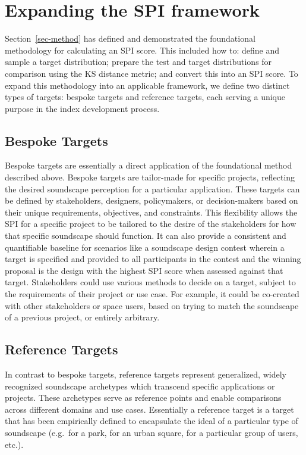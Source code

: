 \documentclass[
  authoryear,
  preprint,
  3p]{elsarticle}
\begin{document}
\section{Expanding the SPI framework}\label{expanding-the-spi-framework}

Section~\ref{sec-method} has defined and demonstrated the foundational
methodology for calculating an SPI score. This included how to: define
and sample a target distribution; prepare the test and target
distributions for comparison using the KS distance metric; and convert
this into an SPI score. To expand this methodology into an applicable
framework, we define two distinct types of targets: bespoke targets and
reference targets, each serving a unique purpose in the index
development process.

\subsection{Bespoke Targets}\label{bespoke-targets}

Bespoke targets are essentially a direct application of the foundational
method described above. Bespoke targets are tailor-made for specific
projects, reflecting the desired soundscape perception for a particular
application. These targets can be defined by stakeholders, designers,
policymakers, or decision-makers based on their unique requirements,
objectives, and constraints. This flexibility allows the SPI for a
specific project to be tailored to the desire of the stakeholders for
how that specific soundscape should function. It can also provide a
consistent and quantifiable baseline for scenarios like a soundscape
design contest wherein a target is specified and provided to all
participants in the contest and the winning proposal is the design with
the highest SPI score when assessed against that target. Stakeholders
could use various methods to decide on a target, subject to the
requirements of their project or use case. For example, it could be
co-created with other stakeholders or space users, based on trying to
match the soundscape of a previous project, or entirely arbitrary.

\subsection{Reference Targets}\label{reference-targets}

In contrast to bespoke targets, reference targets represent generalized,
widely recognized soundscape archetypes which transcend specific
applications or projects. These archetypes serve as reference points and
enable comparisons across different domains and use cases. Essentially a
reference target is a target that has been empirically defined to
encapsulate the ideal of a particular type of soundscape (e.g.~for a
park, for an urban square, for a particular group of users, etc.).
\end{document}
